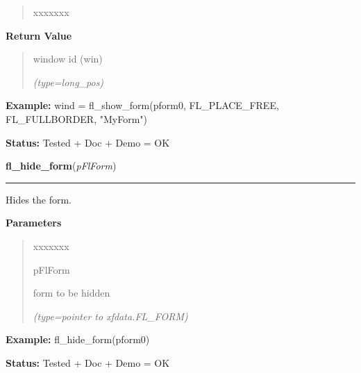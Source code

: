 \begin{boxedminipage}{\funcwidth}
\begin{quote}
\begin{Ventry}{xxxxxxx}
        \end{Ventry}

      \end{quote}

      \textbf{Return Value}
    \vspace{-1ex}

      \begin{quote}
      window id (win)

      {\it (type=long\_pos)}

      \end{quote}

\textbf{Example:} wind = fl\_show\_form(pform0, FL\_PLACE\_FREE, FL\_FULLBORDER, "MyForm")



\textbf{Status:} Tested + Doc + Demo = OK



    \end{boxedminipage}

    \label{xformslib:flbasic:fl_hide_form}

    \vspace{0.5ex}

\hspace{.8\funcindent}\begin{boxedminipage}{\funcwidth}

    \raggedright \textbf{fl\_hide\_form}(\textit{pFlForm})

    \vspace{-1.5ex}

    \rule{\textwidth}{0.5\fboxrule}
\setlength{\parskip}{2ex}
    Hides the form.

\setlength{\parskip}{1ex}
      \textbf{Parameters}
      \vspace{-1ex}

      \begin{quote}
        \begin{Ventry}{xxxxxxx}

          \item[pFlForm]

          form to be hidden

            {\it (type=pointer to xfdata.FL\_FORM)}

        \end{Ventry}

      \end{quote}

\textbf{Example:} fl\_hide\_form(pform0)



\textbf{Status:} Tested + Doc + Demo = OK



    \end{boxedminipage}

